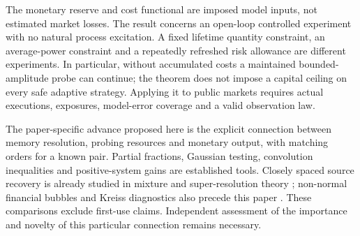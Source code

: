 The monetary reserve and cost functional are imposed model inputs, not estimated market losses. The result concerns an open-loop controlled experiment with no natural process excitation. A fixed lifetime quantity constraint, an average-power constraint and a repeatedly refreshed risk allowance are different experiments. In particular, without accumulated costs a maintained bounded-amplitude probe can continue; the theorem does not impose a capital ceiling on every safe adaptive strategy. Applying it to public markets requires actual executions, exposures, model-error coverage and a valid observation law.

The paper-specific advance proposed here is the explicit connection between memory resolution, probing resources and monetary output, with matching orders for a known pair. Partial fractions, Gaussian testing, convolution inequalities and positive-system gains are established tools. Closely spaced source recovery is already studied in mixture and super-resolution theory \citep{manoleho2022,liuammari2023}; non-normal financial bubbles and Kreiss diagnostics also precede this paper \citep{sornette2023nonnormal}. These comparisons exclude first-use claims. Independent assessment of the importance and novelty of this particular connection remains necessary.
